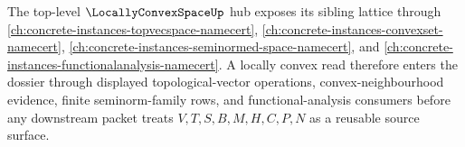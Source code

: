The top-level $\LocallyConvexSpaceUp$ hub exposes its sibling lattice through \autoref{ch:concrete-instances-topvecspace-namecert}, \autoref{ch:concrete-instances-convexset-namecert}, \autoref{ch:concrete-instances-seminormed-space-namecert}, and \autoref{ch:concrete-instances-functionalanalysis-namecert}. A locally convex read therefore enters the dossier through displayed topological-vector operations, convex-neighbourhood evidence, finite seminorm-family rows, and functional-analysis consumers before any downstream packet treats $V,T,S,B,M,H,C,P,N$ as a reusable source surface.
